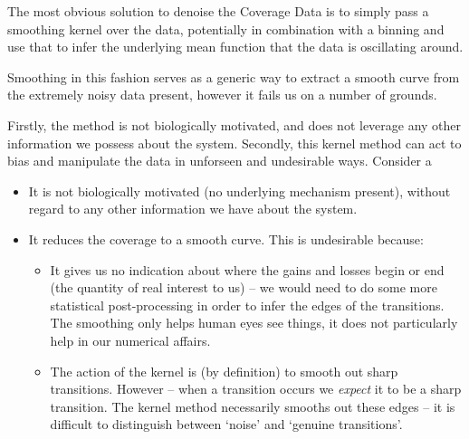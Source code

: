 \documentclass[fleqn,usenatbib]{mnras}
\begin{document}
			The most obvious solution to denoise the Coverage Data is to simply pass a smoothing kernel over the data, potentially in combination with a binning  and use that to infer the underlying mean function that the data is oscillating around.

			Smoothing in this fashion serves as a generic way to extract a smooth curve from the extremely noisy data present, however it fails us on a number of grounds.

			Firstly, the method is not biologically motivated, and does not leverage any other information we possess about the system. Secondly, this kernel method can act to bias and manipulate the data in unforseen and undesirable ways. Consider a 
			\begin{itemize}
				\item It is not biologically motivated (no underlying mechanism present), without regard to any other information we have about the system.
				\item It reduces the coverage to a smooth curve. This is undesirable because:
				\begin{itemize}
					\item It gives us no indication about where the gains and losses begin or end (the quantity of real interest to us) -- we would need to do some more statistical post-processing in order to infer the edges of the transitions. The smoothing only helps human eyes see things, it does not particularly help in our numerical affairs.
					\item The action of the kernel is (by definition) to smooth out sharp transitions. However -- when a transition occurs we \textit{expect} it to be a sharp transition. The kernel method necessarily smooths out these edges -- it is difficult to distinguish between `noise' and `genuine transitions'.
				\end{itemize}
			\end{itemize}


			
\end{document}

